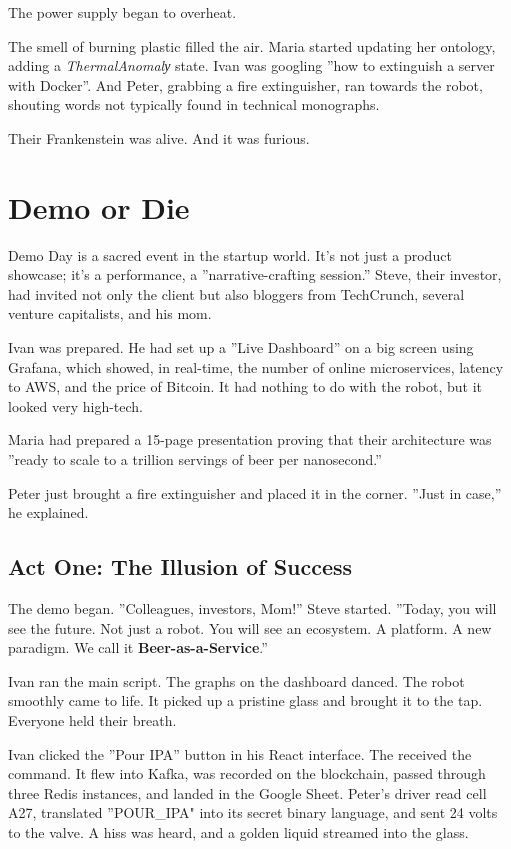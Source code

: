 The power supply began to overheat.

The smell of burning plastic filled the air. Maria started updating her ontology, adding a \textit{ThermalAnomalу} state. Ivan was googling ''how to extinguish a server with Docker''. And Peter, grabbing a fire extinguisher, ran towards the robot, shouting words not typically found in technical monographs.

Their Frankenstein was alive. And it was furious.








\section{Demo or Die}
\label{sec:parable_demoday}

Demo Day is a sacred event in the startup world. It's not just a product showcase; it's a performance, a ''narrative-crafting session.'' Steve, their investor, had invited not only the client but also bloggers from TechCrunch, several venture capitalists, and his mom.

Ivan was prepared. He had set up a ''Live Dashboard'' on a big screen using Grafana, which showed, in real-time, the number of online microservices, latency to AWS, and the price of Bitcoin. It had nothing to do with the robot, but it looked very high-tech.

Maria had prepared a 15-page presentation proving that their architecture was ''ready to scale to a trillion servings of beer per nanosecond.''

Peter just brought a fire extinguisher and placed it in the corner. ''Just in case,'' he explained.

\subsection*{Act One: The Illusion of Success}

The demo began. ''Colleagues, investors, Mom!'' Steve started. ''Today, you will see the future. Not just a robot. You will see an ecosystem. A platform. A new paradigm. We call it \textbf{Beer-as-a-Service}.''

Ivan ran the main script. The graphs on the dashboard danced. The robot smoothly came to life. It picked up a pristine glass and brought it to the tap. Everyone held their breath.

Ivan clicked the ''Pour IPA'' button in his React interface.
The  received the command.
It flew into Kafka, was recorded on the blockchain, passed through three Redis instances, and landed in the Google Sheet.
Peter's driver read cell A27, translated ''POUR\_IPA" into its secret binary language, and sent 24 volts to the valve.
A hiss was heard, and a golden liquid streamed into the glass.

